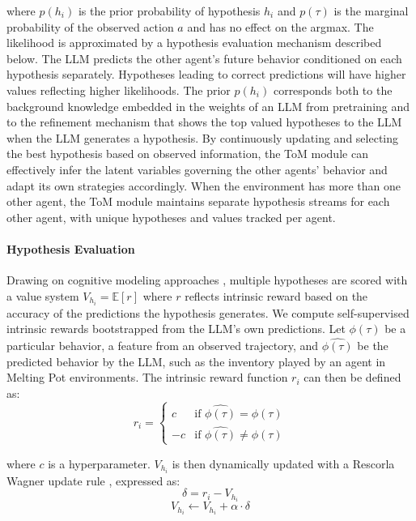 \documentclass{article} %
\begin{document}
where $p(h_i)$ is the prior probability of hypothesis $h_i$ and $p(\tau)$ is the marginal probability of the observed action $a$ and has no effect on the argmax. The likelihood is approximated by a hypothesis evaluation mechanism described below. The LLM predicts the other agent's future behavior conditioned on each hypothesis separately. Hypotheses leading to correct predictions will have higher values reflecting higher likelihoods. The prior $p(h_i)$ corresponds both to the background knowledge embedded in the weights of an LLM from pretraining and to the refinement mechanism that shows the top valued hypotheses to the LLM when the LLM generates a hypothesis. By continuously updating and selecting the best hypothesis based on observed information, the ToM module can effectively infer the latent variables governing the other agents' behavior and adapt its own strategies accordingly. When the environment has more than one other agent, the ToM module maintains separate hypothesis streams for each other agent, with unique hypotheses and values tracked per agent.

\paragraph{Hypothesis Evaluation}

Drawing on cognitive modeling approaches \citep{rescorla1972theory,daw2014value}, multiple hypotheses are scored with a value system $V_{h_i} = \mathbb{E}[r]$ where $r$ reflects intrinsic reward based on the accuracy of the predictions the hypothesis generates. We compute self-supervised intrinsic rewards bootstrapped from the LLM's own predictions. Let \( \phi(\tau) \) be a particular behavior, a feature from an observed trajectory, and \( \hat{\phi(\tau)} \) be the predicted behavior by the LLM, such as the inventory played by an agent in Melting Pot environments. The intrinsic reward function \( r_i \) can then be defined as:
\vspace{-5pt}
\[
r_i = 
\begin{cases} 
c & \text{if } \hat{\phi(\tau)} = \phi(\tau) \\
-c & \text{if } \hat{\phi(\tau)} \neq \phi(\tau)
\end{cases}
\]

where \( c \) is a hyperparameter. \(V_{h_i}\) is then dynamically updated with a Rescorla Wagner update rule \citep{rescorla1972theory} , expressed as:
\[
\delta = r_i - V_{h_i}
\]
\[
V_{h_i} \leftarrow V_{h_i} + \alpha \cdot \delta
\]
\end{document}
